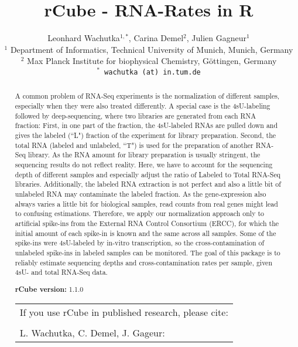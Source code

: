 \documentclass{article}\usepackage[]{graphicx}\usepackage[usenames,dvipsnames]{color}
\title{rCube - RNA-Rates in R}
\author{Leonhard Wachutka$^{1,*}$, Carina Demel$^{2}$, Julien Gagneur$^{1}$ \\
[1em] \small{$^{1}$ Department of Informatics, Technical University of Munich, Munich, Germany} \\
\small{$^{2}$ Max Planck Institute for biophysical Chemistry, G\"ottingen, Germany} \\
\small{\texttt{$^*$ wachutka (at) in.tum.de}}
}
\begin{document}
\maketitle






\begin{abstract}
A common problem of RNA-Seq experiments is the normalization of different
samples, especially when they were also treated differently. A special case is
the 4sU-labeling followed by deep-sequencing, where two libraries are generated
from each RNA fraction: First, in one part of the fraction, the 4sU-labeled
RNAs are pulled down and gives the labeled (``L") fraction of the experiment for
library preparation. Second, the total RNA (labeled and unlabeled, ``T") is used
for the preparation of another RNA-Seq library. As the RNA amount for library
preparation is usually stringent, the sequencing results do not reflect
reality. Here, we have to account for the sequencing depth of different samples
and especially adjust the ratio of Labeled to Total RNA-Seq libraries.
Additionally, the labeled RNA extraction is not perfect and also a little bit
of unlabeled RNA may contaminate the labeled fraction. As the gene-expression
also always varies a little bit for biological samples, read counts from real
genes might lead to confusing estimations. Therefore, we apply our
normalization approach only to artificial spike-ins from the External RNA 
Control Consortium (ERCC), for which
the initial amount of each spike-in is known and the same across all samples.
Some of the spike-ins were 4sU-labeled by in-vitro transcription, so the
cross-contamination of unlabeled spike-ins in labeled samples can be monitored.
The goal of this package is to reliably estimate sequencing depths and
cross-contamination rates per sample, given 4sU- and total RNA-Seq data.

\vspace{1em}
  
  \textbf{rCube version:} 1.1.0

  \vspace{1em}
  
  \begin{center}
    \begin{tabular}{ | l | }
      \hline 
      If you use rCube in published research, please cite:  \\
      \\
      L. Wachutka, C. Demel, J. Gageur: \\ %
      \hline 
    \end{tabular}
  \end{center}
  
\end{abstract}
\end{document}
